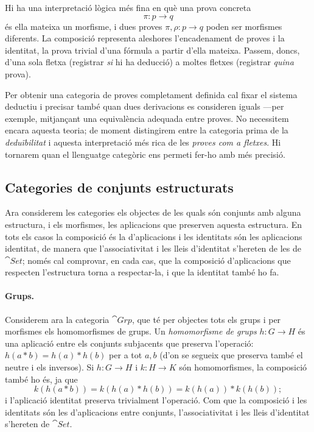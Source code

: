 \begin{observacio}
Hi ha una interpretació lògica més fina en què una prova concreta
\[
\pi\colon p\longrightarrow q
\]
és ella mateixa un morfisme, i dues proves $\pi,\rho\colon p\to q$ poden ser morfismes diferents. La composició representa aleshores l'encadenament de proves i la identitat, la prova trivial d'una fórmula a partir d'ella mateixa. Passem, doncs, d'una sola fletxa (registrar \emph{si} hi ha deducció) a moltes fletxes (registrar \emph{quina} prova).

Per obtenir una categoria de proves completament definida cal fixar el sistema deductiu i precisar també quan dues derivacions es consideren iguals ---per exemple, mitjançant una equivalència adequada entre proves. No necessitem encara aquesta teoria; de moment distingirem entre la categoria prima de la \emph{deduïbilitat} i aquesta interpretació més rica de les \emph{proves com a fletxes}. Hi tornarem quan el llenguatge categòric ens permeti fer-ho amb més precisió.
\end{observacio}

\subsection{Categories de conjunts estructurats}

Ara considerem les categories els objectes de les quals són conjunts amb alguna estructura, i els morfismes, les aplicacions que preserven aquesta estructura. En tots els casos la composició és la d'aplicacions i les identitats són les aplicacions identitat, de manera que l'associativitat i les lleis d'identitat s'hereten de les de $\cat{Set}$; només cal comprovar, en cada cas, que la composició d'aplicacions que respecten l'estructura torna a respectar-la, i que la identitat també ho fa.

\paragraph{Grups.}
Considerem ara la categoria $\cat{Grp}$, que té per objectes tots els grups i per morfismes els homomorfismes de grups. Un \emph{homomorfisme de grups} $h\colon G\to H$ és una aplicació entre els conjunts subjacents que preserva l'operació: $h(a\ast b)=h(a)\ast h(b)$ per a tot $a,b$ (d'on se segueix que preserva també el neutre i els inversos). Si $h\colon G\to H$ i $k\colon H\to K$ són homomorfismes, la composició també ho és, ja que
\[
k(h(a\ast b))=k(h(a)\ast h(b))=k(h(a))\ast k(h(b));
\]
i l'aplicació identitat preserva trivialment l'operació. Com que la composició i les identitats són les d'aplicacions entre conjunts, l'associativitat i les lleis d'identitat s'hereten de $\cat{Set}$.

